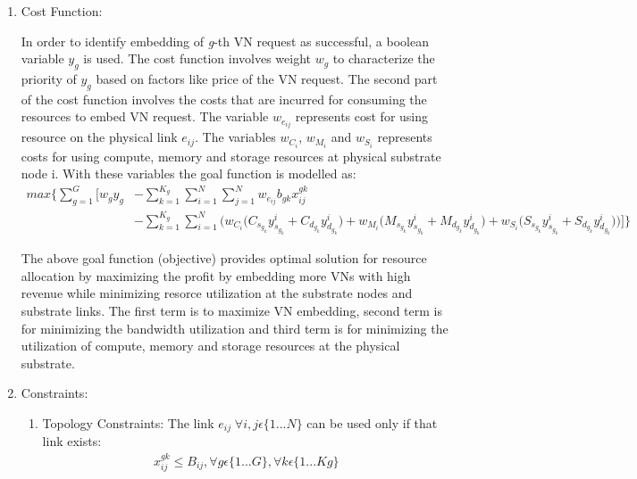 \documentclass[article,dr=phil,type=msc ,colorback,accentcolor=tud4b]{tudthesis}
\begin{document}
\begin{enumerate}[label=(\Alph*)]
	\item  Cost Function: 
	
	In order to identify embedding of \textit{g}-th VN request as successful, a boolean variable $y_{g}$ is used. The cost function involves weight $w_{g}$ to characterize the priority of $y_{g}$ based on factors like price of the VN request. The second part of the cost function involves the costs that are incurred for consuming the resources to embed VN request. The variable $w_{e_{ij}}$ represents cost for using resource on the physical link $e_{ij}$. The variables $w_{C_{i}}$, $w_{M_{i}}$ and $w_{S_{i}}$ represents costs for using compute, memory and storage resources at physical substrate node i. With these variables the goal function is modelled as:
	\begin{equation} \label{edwin_gf}
	\begin{aligned}
	max \big\{ \sum^{G}_{g=1}\big[ w_{g} y_{g} &- \sum^{K_{g}}_{k=1} \sum^{N}_{i=1} \sum^{N}_{j=1} w_{e_{ij}} b_{gk} x^{gk}_{ij}\\ &- \sum^{K_{g}}_{k=1} \sum^{N}_{i=1} \big(w_{C_{i}} \big( C_{s_{g_{k}}} y^{i}_{s_{g_{k}}} + C_{d_{g_{k}}} y^{i}_{d_{g_{k}}} \big) + w_{M_{i}} \big( M_{s_{g_{k}}} y^{i}_{s_{g_{k}}} + M_{d_{g_{k}}} y^{i}_{d_{g_{k}}} \big) + w_{S_{i}} \big( S_{s_{g_{k}}} y^{i}_{s_{g_{k}}} + S_{d_{g_{k}}} y^{i}_{d_{g_{k}}}\big) \big)\big]\big\}
	\end{aligned}
	\end{equation} 
	
	The above goal function (objective) provides optimal solution for resource allocation by maximizing the profit by embedding more VNs with high revenue while minimizing resorce utilization at the substrate nodes and substrate links. The first term is to maximize VN embedding, second term is for minimizing the bandwidth utilization and third term is for minimizing the utilization of compute, memory and storage resources at the physical substrate. \newline
	
	\item  Constraints: 
	\begin{enumerate}
		\item  Topology Constraints: The link \textit{$e_{ij} \; \forall i, j \epsilon \{1...N\}$} can be used only if that link exists:
		\begin{equation}
		\begin{aligned}
		x^{gk}_{ij} \leq B_{ij}, \forall g \epsilon\{1...G\}, \forall k \epsilon\{1...K{g}\}
		\end{aligned}
		\end{equation} 
		

\end{enumerate}
\end{enumerate}
\end{document}
